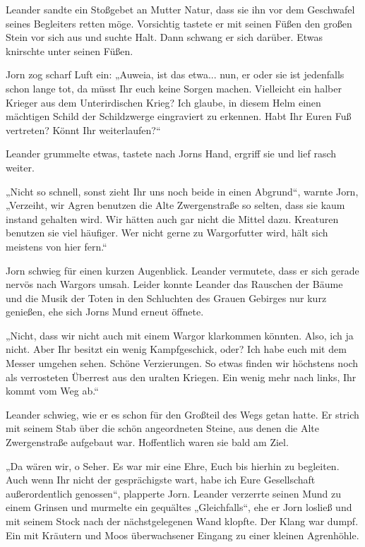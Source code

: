 Leander sandte ein Stoßgebet an Mutter Natur, dass sie ihn vor dem Geschwafel seines Begleiters retten möge. Vorsichtig tastete er mit seinen Füßen den großen Stein vor sich aus und suchte Halt. Dann schwang er sich darüber. Etwas knirschte unter seinen Füßen.

Jorn zog scharf Luft ein: „Auweia, ist das etwa... nun, er oder sie ist jedenfalls schon lange tot, da müsst Ihr euch keine Sorgen machen. Vielleicht ein halber Krieger aus dem Unterirdischen Krieg? Ich glaube, in diesem Helm einen mächtigen Schild der Schildzwerge eingraviert zu erkennen. Habt Ihr Euren Fuß vertreten? Könnt Ihr weiterlaufen?“

Leander grummelte etwas, tastete nach Jorns Hand, ergriff sie und lief rasch weiter.

„Nicht so schnell, sonst zieht Ihr uns noch beide in einen Abgrund“, warnte Jorn, „Verzeiht, wir Agren benutzen die Alte Zwergenstraße so selten, dass sie kaum instand gehalten wird. Wir hätten auch gar nicht die Mittel dazu. Kreaturen benutzen sie viel häufiger. Wer nicht gerne zu Wargorfutter wird, hält sich meistens von hier fern.“

Jorn schwieg für einen kurzen Augenblick. Leander vermutete, dass er sich gerade nervös nach Wargors umsah. Leider konnte Leander das Rauschen der Bäume und die Musik der Toten in den Schluchten des Grauen Gebirges nur kurz genießen, ehe sich Jorns Mund erneut öffnete.

„Nicht, dass wir nicht auch mit einem Wargor klarkommen könnten. Also, ich ja nicht. Aber Ihr besitzt ein wenig Kampfgeschick, oder? Ich habe euch mit dem Messer umgehen sehen. Schöne Verzierungen. So etwas finden wir höchstens noch als verrosteten Überrest aus den uralten Kriegen. Ein wenig mehr nach links, Ihr kommt vom Weg ab.“

Leander schwieg, wie er es schon für den Großteil des Wegs getan hatte. Er strich mit seinem Stab über die schön angeordneten Steine, aus denen die Alte Zwergenstraße aufgebaut war. Hoffentlich waren sie bald am Ziel.



\trennzeichen



„Da wären wir, o Seher. Es war mir eine Ehre, Euch bis hierhin zu begleiten. Auch wenn Ihr nicht der gesprächigste wart, habe ich Eure Gesellschaft außerordentlich genossen“, plapperte Jorn. Leander verzerrte seinen Mund zu einem Grinsen und murmelte ein gequältes „Gleichfalls“, ehe er Jorn losließ und mit seinem Stock nach der nächstgelegenen Wand klopfte. Der Klang war dumpf. Ein mit Kräutern und Moos überwachsener Eingang zu einer kleinen Agrenhöhle.

